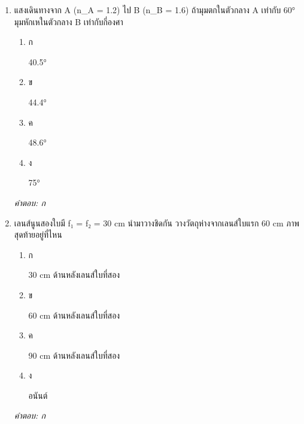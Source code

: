 \documentclass[12pt]{article}
\begin{document}
\begin{enumerate}[label=\arabic*., itemsep=0.5\baselineskip, topsep=0.5\baselineskip, leftmargin=*]
\item แสงเดินทางจาก A (n\_A = 1.2) ไป B (n\_B = 1.6) ถ้ามุมตกในตัวกลาง A เท่ากับ 60° มุมหักเหในตัวกลาง B เท่ากับกี่องศา
\begin{enumerate}[label=\alph*)., itemsep=0.3\baselineskip, topsep=0.3\baselineskip]
\item ก\ 
\begin{minipage}[t]{0.9\linewidth}
\raggedright 40.5°
\end{minipage}
\item ข\ 
\begin{minipage}[t]{0.9\linewidth}
\raggedright 44.4°
\end{minipage}
\item ค\ 
\begin{minipage}[t]{0.9\linewidth}
\raggedright 48.6°
\end{minipage}
\item ง\ 
\begin{minipage}[t]{0.9\linewidth}
\raggedright 75°
\end{minipage}
\end{enumerate}
\vspace{-0.3\baselineskip}
\begin{small}
\textit{คำตอบ: ก}
\end{small}

\item เลนส์นูนสองใบมี f₁ = f₂ = 30 cm นำมาวางชิดกัน วางวัตถุห่างจากเลนส์ใบแรก 60 cm ภาพสุดท้ายอยู่ที่ไหน
\begin{enumerate}[label=\alph*)., itemsep=0.3\baselineskip, topsep=0.3\baselineskip]
\item ก\ 
\begin{minipage}[t]{0.9\linewidth}
\raggedright 30 cm ด้านหลังเลนส์ใบที่สอง
\end{minipage}
\item ข\ 
\begin{minipage}[t]{0.9\linewidth}
\raggedright 60 cm ด้านหลังเลนส์ใบที่สอง
\end{minipage}
\item ค\ 
\begin{minipage}[t]{0.9\linewidth}
\raggedright 90 cm ด้านหลังเลนส์ใบที่สอง
\end{minipage}
\item ง\ 
\begin{minipage}[t]{0.9\linewidth}
\raggedright อนันต์
\end{minipage}
\end{enumerate}
\vspace{-0.3\baselineskip}
\begin{small}
\textit{คำตอบ: ก}
\end{small}


\end{enumerate}
\end{document}
